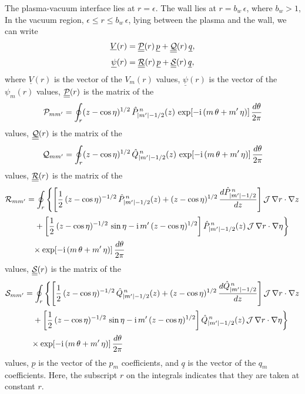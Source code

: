 \documentclass[12pt,prb,aps,notitlepage]{revtex4-1}
\begin{document}
The plasma-vacuum interface lies at $r=\epsilon$. The wall lies at $r=b_w\,\epsilon$, where $b_w>1$,  In the
vacuum region, $\epsilon\leq r\leq b_w\,\epsilon$,  lying between the plasma and the wall, we can write
\begin{align}\label{e32a}
\underline{V}(r)&= \underline{\underline{{\cal P}}}(r)\,\underline{p}+ \underline{\underline{{\cal Q}}}(r)\,\underline{q},\\[0.5ex]
\underline{\psi}(r)&= \underline{\underline{{\cal R}}}(r)\,\underline{p}+ \underline{\underline{{\cal S}}}(r)\,\underline{q},\label{e33a}
\end{align}
where $\underline{V}(r)$ is the vector of the $V_m(r)$ values, $\underline{\psi}(r)$ is the vector of the $\psi_m(r)$ values, $\underline{\underline{{\cal P}}}(r)$ is the
matrix of the
\begin{equation}
{\cal P}_{mm'}=\oint_{r}(z-\cos\eta)^{1/2}\,\hat{P}_{|m'|-1/2}^{\,n}(z)\,\exp[-{\rm i}\,(m\,\theta+m'\,\eta)]\,\frac{d\theta}{2\pi}
\end{equation}
values, 
$\underline{\underline{{\cal Q}}}(r)$ is the
matrix of the
\begin{equation}
{\cal Q}_{mm'}=\oint_{r}(z-\cos\eta)^{1/2}\,\hat{Q}_{|m'|-1/2}^{\,n}(z)\,\exp[-{\rm i}\,(m\,\theta+m'\,\eta)]\,\frac{d\theta}{2\pi}
\end{equation}
values, $\underline{\underline{{\cal R}}}(r)$ is the matrix of the 
\begin{align}\label{e354}
{\cal R}_{mm'} &=\oint_{r}
\left\{\left[\frac{1}{2}\,(z-\cos\eta)^{-1/2}\,\hat{P}_{|m'|-1/2}^{\,n}(z)+(z-\cos\eta)^{1/2}\,\frac{d\hat{P}_{|m'|-1/2}^{\,n}}{dz}\right]{\cal J}\,\nabla r\cdot \nabla z
\right.\nonumber\\[0.5ex]&
\left.\phantom{=}+\left[\frac{1}{2}\,(z-\cos\eta)^{-1/2}\,\sin\eta-{\rm i}\,m'\,(z-\cos\eta)^{1/2}\right]\hat{P}_{|m'|-1/2}^{\,n}(z)\,{\cal J}\,\nabla r\cdot \nabla \eta
\right\}\nonumber\\[0.5ex] &
\phantom{=}\times\exp[-{\rm i}\,(m\,\theta+m'\,\eta)]\,\frac{d\theta}{2\pi}
\end{align}
values, 
$\underline{\underline{{\cal S}}}(r)$ is the matrix of the 
\begin{align}\label{e355}
{\cal S}_{mm'} &=\oint_{r}
\left\{\left[\frac{1}{2}\,(z-\cos\eta)^{-1/2}\,\hat{Q}_{|m'|-1/2}^{\,n}(z)+(z-\cos\eta)^{1/2}\,\frac{d\hat{Q}_{|m'|-1/2}^{\,n}}{dz}\right]{\cal J}\,\nabla r\cdot \nabla z
\right.\nonumber\\[0.5ex]&
\left.\phantom{=}+\left[\frac{1}{2}\,(z-\cos\eta)^{-1/2}\,\sin\eta-{\rm i}\,m'\,(z-\cos\eta)^{1/2}\right]\hat{Q}_{|m'|-1/2}^{\,n}(z)\,{\cal J}\,\nabla r\cdot \nabla \eta
\right\}\nonumber\\[0.5ex] &
\phantom{=}\times\exp[-{\rm i}\,(m\,\theta+m'\,\eta)]\,\frac{d\theta}{2\pi}
\end{align}
values, $\underline{p}$ is the vector of the $p_m$ coefficients, and  $\underline{q}$ is the vector of the $q_m$ coefficients. Here, the
subscript $r$ on the integrals indicates that they are taken at constant $r$. 
\end{document}
